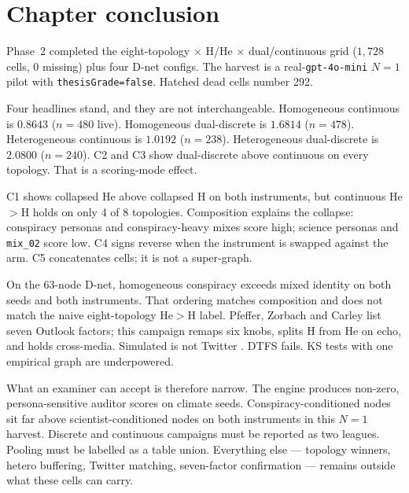 \section{Chapter conclusion}
\label{sec:conclusion}

Phase~2 completed the eight-topology $\times$ H/He $\times$ dual/continuous grid ($1{,}728$ cells, $0$ missing) plus four D-net configs.
The harvest is a real-\texttt{gpt-4o-mini} $N=1$ pilot with \texttt{thesisGrade=false}.
Hatched dead cells number 292.

Four headlines stand, and they are not interchangeable.
Homogeneous continuous \MPR{} is $0.8643$ ($n=480$ live).
Homogeneous dual-discrete \MPR{} is $1.6814$ ($n=478$).
Heterogeneous continuous \MPR{} is $1.0192$ ($n=238$).
Heterogeneous dual-discrete \MPR{} is $2.0800$ ($n=240$).
C2 and C3 show dual-discrete above continuous on every topology.
That is a scoring-mode effect.

C1 shows collapsed He above collapsed H on both instruments, but continuous He$>$H holds on only 4 of 8 topologies.
Composition explains the collapse: conspiracy personas and conspiracy-heavy mixes score high; science personas and \texttt{mix\_02} score low.
C4 signs reverse when the instrument is swapped against the arm.
C5 concatenates cells; it is not a super-graph.

On the 63-node D-net, homogeneous conspiracy exceeds mixed identity on both seeds and both instruments.
That ordering matches composition and does not match the naive eight-topology He$>$H label.
Pfeffer, Zorbach and Carley list seven Outlook factors; this campaign remaps six knobs, splits H from He on echo, and holds cross-media.
Simulated \MI{} is not Twitter \MPR{}.
DTFS fails.
KS tests with one empirical graph are underpowered.

What an examiner can accept is therefore narrow.
The engine produces non-zero, persona-sensitive auditor scores on climate seeds.
Conspiracy-conditioned nodes sit far above scientist-conditioned nodes on both instruments in this $N=1$ harvest.
Discrete and continuous campaigns must be reported as two leagues.
Pooling must be labelled as a table union.
Everything else --- topology winners, hetero buffering, Twitter matching, seven-factor confirmation --- remains outside what these cells can carry.

